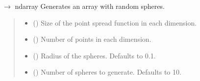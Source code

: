 \documentclass[letterpaper,10pt,english]{sphinxmanual}
\begin{document}

\begin{fulllineitems}
\label{\detokenize{source/ShapesGenerator:ShapesGenerator.generate_random_spheres}}
\pysigstartsignatures
\pysiglinewithargsret
{}
{\sphinxparamcomma {}\sphinxparamcomma {}\sphinxparamcomma {}\sphinxparamcomma {}}
{{ $\rightarrow$ ndarray}}
\pysigstopsignatures
\sphinxAtStartPar
Generates an array with random spheres.
\begin{quote}\begin{description}
\begin{itemize}
\item {} 
\sphinxAtStartPar
{} (\sphinxstyleliteralemphasis{\sphinxupquote{{[}}}\sphinxstyleliteralemphasis{\sphinxupquote{, }}\sphinxstyleliteralemphasis{\sphinxupquote{, }}\sphinxstyleliteralemphasis{\sphinxupquote{{]}}}) \textendash{} Size of the point spread function in each dimension.

\item {} 
\sphinxAtStartPar
{} () \textendash{} Number of points in each dimension.

\item {} 
\sphinxAtStartPar
{} (\sphinxstyleliteralemphasis{\sphinxupquote{, }}) \textendash{} Radius of the spheres. Defaults to 0.1.

\item {} 
\sphinxAtStartPar
{} (\sphinxstyleliteralemphasis{\sphinxupquote{, }}) \textendash{} Number of spheres to generate. Defaults to 10.


\end{itemize}
\end{description}
\end{quote}
\end{fulllineitems}
\end{document}
